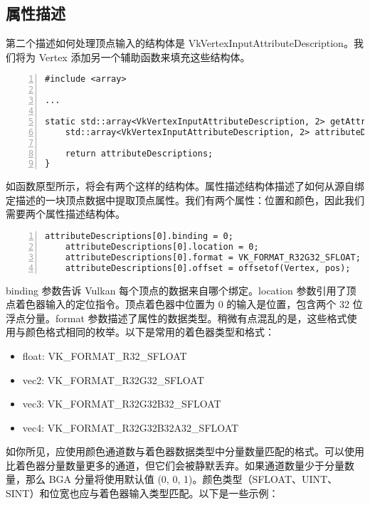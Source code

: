 \documentclass{ctexart}
\begin{document}
\subsection{属性描述}
第二个描述如何处理顶点输入的结构体是 VkVertexInputAttributeDescription。我们将为 Vertex 添加另一个辅助函数来填充这些结构体。
\begin{lstlisting}[language={[ANSI]C},keywordstyle=\color{blue!70},commentstyle=\color{red!50!green!50!blue!50},frame=shadowbox, rulesepcolor=\color{red!20!green!20!blue!20},basicstyle=\small,numbers=left, numberstyle=\tiny,breaklines=true]
#include <array>

...

static std::array<VkVertexInputAttributeDescription, 2> getAttributeDescriptions() {
	std::array<VkVertexInputAttributeDescription, 2> attributeDescriptions{};

	return attributeDescriptions;
}
\end{lstlisting}
如函数原型所示，将会有两个这样的结构体。属性描述结构体描述了如何从源自绑定描述的一块顶点数据中提取顶点属性。我们有两个属性：位置和颜色，因此我们需要两个属性描述结构体。
\begin{lstlisting}[language={[ANSI]C},keywordstyle=\color{blue!70},commentstyle=\color{red!50!green!50!blue!50},frame=shadowbox, rulesepcolor=\color{red!20!green!20!blue!20},basicstyle=\small,numbers=left, numberstyle=\tiny,breaklines=true]
	attributeDescriptions[0].binding = 0;
	attributeDescriptions[0].location = 0;
	attributeDescriptions[0].format = VK_FORMAT_R32G32_SFLOAT;
	attributeDescriptions[0].offset = offsetof(Vertex, pos);
\end{lstlisting}
binding 参数告诉 Vulkan 每个顶点的数据来自哪个绑定。location 参数引用了顶点着色器输入的定位指令。顶点着色器中位置为 0 的输入是位置，包含两个 32 位浮点分量。format 参数描述了属性的数据类型。稍微有点混乱的是，这些格式使用与颜色格式相同的枚举。以下是常用的着色器类型和格式：
\begin{itemize}
	\item float: VK\_FORMAT\_R32\_SFLOAT
	\item vec2: VK\_FORMAT\_R32G32\_SFLOAT
	\item vec3: VK\_FORMAT\_R32G32B32\_SFLOAT
	\item vec4: VK\_FORMAT\_R32G32B32A32\_SFLOAT
\end{itemize}
如你所见，应使用颜色通道数与着色器数据类型中分量数量匹配的格式。可以使用比着色器分量数量更多的通道，但它们会被静默丢弃。如果通道数量少于分量数量，那么 BGA 分量将使用默认值 (0, 0, 1)。颜色类型（SFLOAT、UINT、SINT）和位宽也应与着色器输入类型匹配。以下是一些示例：
\end{document}
